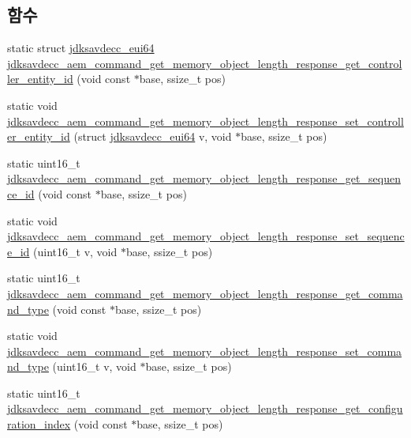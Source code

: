 \subsection*{함수}
\begin{DoxyCompactItemize}
\item 
static struct \hyperlink{structjdksavdecc__eui64}{jdksavdecc\+\_\+eui64} \hyperlink{group__command__aem__get__memory__object__length__response_gabb5ea5191464f4b886ce9c77d3d91a10}{jdksavdecc\+\_\+aem\+\_\+command\+\_\+get\+\_\+memory\+\_\+object\+\_\+length\+\_\+response\+\_\+get\+\_\+controller\+\_\+entity\+\_\+id} (void const $\ast$base, ssize\+\_\+t pos)
\item 
static void \hyperlink{group__command__aem__get__memory__object__length__response_gab93d50ca74bb58bfeb1f2a4e57203956}{jdksavdecc\+\_\+aem\+\_\+command\+\_\+get\+\_\+memory\+\_\+object\+\_\+length\+\_\+response\+\_\+set\+\_\+controller\+\_\+entity\+\_\+id} (struct \hyperlink{structjdksavdecc__eui64}{jdksavdecc\+\_\+eui64} v, void $\ast$base, ssize\+\_\+t pos)
\item 
static uint16\+\_\+t \hyperlink{group__command__aem__get__memory__object__length__response_gabe641ea734afa83b06fb3a09f1d831ad}{jdksavdecc\+\_\+aem\+\_\+command\+\_\+get\+\_\+memory\+\_\+object\+\_\+length\+\_\+response\+\_\+get\+\_\+sequence\+\_\+id} (void const $\ast$base, ssize\+\_\+t pos)
\item 
static void \hyperlink{group__command__aem__get__memory__object__length__response_ga17f00824ad62948af4067c7957b9b517}{jdksavdecc\+\_\+aem\+\_\+command\+\_\+get\+\_\+memory\+\_\+object\+\_\+length\+\_\+response\+\_\+set\+\_\+sequence\+\_\+id} (uint16\+\_\+t v, void $\ast$base, ssize\+\_\+t pos)
\item 
static uint16\+\_\+t \hyperlink{group__command__aem__get__memory__object__length__response_ga1befa9c5a4b490a24b38b25ffaa1425c}{jdksavdecc\+\_\+aem\+\_\+command\+\_\+get\+\_\+memory\+\_\+object\+\_\+length\+\_\+response\+\_\+get\+\_\+command\+\_\+type} (void const $\ast$base, ssize\+\_\+t pos)
\item 
static void \hyperlink{group__command__aem__get__memory__object__length__response_ga2418450017b0aed241b970fc7f511197}{jdksavdecc\+\_\+aem\+\_\+command\+\_\+get\+\_\+memory\+\_\+object\+\_\+length\+\_\+response\+\_\+set\+\_\+command\+\_\+type} (uint16\+\_\+t v, void $\ast$base, ssize\+\_\+t pos)
\item 
static uint16\+\_\+t \hyperlink{group__command__aem__get__memory__object__length__response_ga3d589633c277ced79ab91fd3b1de7381}{jdksavdecc\+\_\+aem\+\_\+command\+\_\+get\+\_\+memory\+\_\+object\+\_\+length\+\_\+response\+\_\+get\+\_\+configuration\+\_\+index} (void const $\ast$base, ssize\+\_\+t pos)

\end{DoxyCompactItemize}
